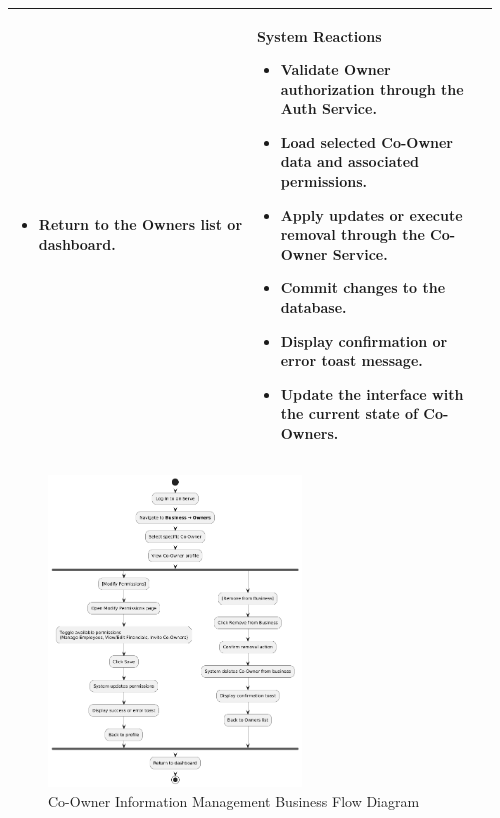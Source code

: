 \documentclass[]{VUMIFTemplateClass}
\newenvironment{mpitemlist}[1][\linewidth]{%
    \begin{minipage}[t]{#1}%
        \setlength{\leftmargini}{12pt}%
        \begin{itemize}%
            \setlength{\itemsep}{1pt}%
            \setlength{\parskip}{0pt}%
            \setlength{\parsep}{0pt}%
}{%
        \end{itemize}%
    \end{minipage}\newline
}
\begin{document}
\begin{center}
\begin{tabular}{|p{0.48\linewidth}|p{0.48\linewidth}|}
\begin{mpitemlist}
\item Return to the Owners list or dashboard.
\end{mpitemlist}
&
\textbf{System Reactions} \newline
\begin{mpitemlist}
\item Validate Owner authorization through the Auth Service.
\item Load selected Co-Owner data and associated permissions.
\item Apply updates or execute removal through the Co-Owner Service.
\item Commit changes to the database.
\item Display confirmation or error toast message.
\item Update the interface with the current state of Co-Owners.
\end{mpitemlist}
\\ \hline
\end{tabular}
\end{center}

\begin{figure}[H]
    \centering
    \includegraphics[width=0.6\textwidth]{docs/ps-design/design-document/images/diagrams/business/bpmn_manage_coowner_information.png}
    \caption{Co-Owner Information Management Business Flow Diagram}
    \label{fig:manage_co_owner_information_business_flow}
\end{figure}
\end{document}
